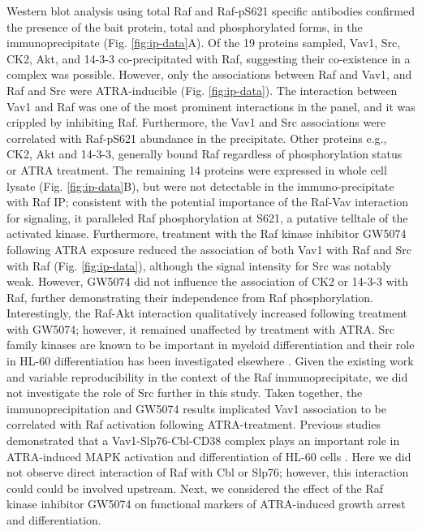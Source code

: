 \documentclass[12pt]{article}
\begin{document}
Western blot analysis using total Raf and Raf-pS621 specific antibodies confirmed the
presence of the bait protein, total and phosphorylated forms, in the immunoprecipitate (Fig. \ref{fig:ip-data}A).
Of the 19 proteins sampled, Vav1, Src, CK2, Akt, and 14-3-3 co-precipitated with Raf, suggesting their co-existence in a complex was possible.
However, only the associations between Raf and Vav1, and Raf and Src were ATRA-inducible (Fig. \ref{fig:ip-data}).
The interaction between Vav1 and Raf was one of the most prominent interactions in the panel, and it was crippled by inhibiting Raf.
Furthermore, the Vav1 and Src associations were correlated with Raf-pS621 abundance in the precipitate.
Other proteins e.g., CK2, Akt and 14-3-3, generally bound Raf regardless of phosphorylation status or ATRA treatment.
The remaining 14 proteins were expressed in whole cell lysate (Fig. \ref{fig:ip-data}B),
but were not detectable in the immuno-precipitate with Raf IP; consistent with the potential importance of the Raf-Vav interaction for signaling, it paralleled Raf phosphorylation at S621, a putative telltale of the activated kinase.
Furthermore, treatment with the Raf kinase inhibitor GW5074 following ATRA exposure reduced the association of both Vav1 with Raf and Src with Raf (Fig. \ref{fig:ip-data}),
although the signal intensity for Src was notably weak.
However, GW5074 did not influence the association of CK2 or 14-3-3 with Raf, further demonstrating their independence from Raf phosphorylation.
Interestingly, the Raf-Akt interaction qualitatively increased following treatment with GW5074;
however, it remained unaffected by treatment with ATRA.
Src family kinases are known to be important in myeloid differentiation \cite{Miranda2007} and their role in HL-60 differentiation has been investigated elsewhere \cite{Congleton:2012fk}.
Given the existing work and variable reproducibility in the context of the Raf immunoprecipitate,
we did not investigate the role of Src further in this study.
Taken together, the immunoprecipitation and GW5074 results implicated Vav1 association to be correlated with Raf activation following ATRA-treatment.
Previous studies demonstrated that a Vav1-Slp76-Cbl-CD38 complex plays an important role in ATRA-induced MAPK activation and differentiation of HL-60 cells \cite{Shen:2009aa}.
Here we did not observe direct interaction of Raf with Cbl or Slp76;
however, this interaction could could be involved upstream.
Next, we considered the effect of the Raf kinase inhibitor GW5074 on functional markers of ATRA-induced growth arrest and differentiation.
\end{document}
